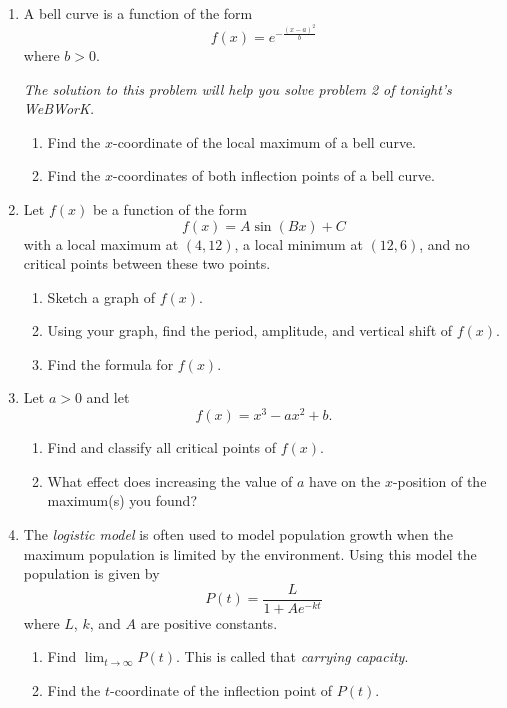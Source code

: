 \documentclass[11pt]{article}
\begin{document}
\drawtitle
\begin{enumerate}
\item A bell curve is a function of the form
  \[
  f(x) = e^{-\frac{(x-a)^2}{b}}
  \]
  where $b>0$.

  \textit{The solution to this problem will help you solve problem 2
    of tonight's WeBWorK.}
  
  \begin{enumerate}
  \item Find the $x$-coordinate of the local maximum of a bell curve.
    \vfill
  \item Find the $x$-coordinates of both inflection points of a bell curve.
    \vfill
  \end{enumerate}

  \newpage


\item Let $f(x)$ be a function of the form
  \[
  f(x) = A\sin(Bx)+C
  \]
  with a local maximum at $(4, 12)$, a local minimum at $(12, 6)$, and
  no critical points between these two points.

  \begin{enumerate}
  \item Sketch a graph of $f(x)$.
    \vfill
  \item Using your graph, find the period, amplitude, and vertical shift of $f(x)$.
    \vfill
  \item Find the formula for $f(x)$.
    \vfill
  \end{enumerate}

  \newpage
  
\item Let $a > 0$ and let
  \[
  f(x) = x^3-ax^2+b.
  \]
  \begin{enumerate}
  \item Find and classify all critical points of $f(x)$.
    \vfill
  \item What effect does increasing the value of $a$ have on the
    $x$-position of the maximum(s) you found?
    \vfill
  \end{enumerate}

  \newpage

\item The \textit{logistic model} is often used to model population
  growth when the maximum population is limited by the environment.
  Using this model the population is given by
  \[
  P(t) = \frac{L}{1+Ae^{-kt}}
  \]
  where $L$, $k$, and $A$ are positive constants.

  \begin{enumerate}
  \item Find $\displaystyle \lim_{t\to\infty} P(t)$.  This is called
    that \textit{carrying capacity}.
    \vfill
  \item Find the $t$-coordinate of the inflection point of $P(t)$.
    \vfill
  \end{enumerate}
  

\end{enumerate}
\end{document}
